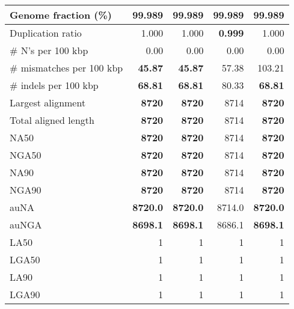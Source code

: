 \documentclass[12pt,a4paper]{article}
\begin{document}
\begin{table}[ht]
\begin{center}
\begin{tabular}{|l*{4}{|r}|}
Genome fraction (\%) & 99.989 & 99.989 & 99.989 & 99.989 \\ \hline
Duplication ratio & 1.000 & 1.000 & {\bf 0.999} & 1.000 \\ \hline
\# N's per 100 kbp & 0.00 & 0.00 & 0.00 & 0.00 \\ \hline
\# mismatches per 100 kbp & {\bf 45.87} & {\bf 45.87} & 57.38 & 103.21 \\ \hline
\# indels per 100 kbp & {\bf 68.81} & {\bf 68.81} & 80.33 & {\bf 68.81} \\ \hline
Largest alignment & {\bf 8720} & {\bf 8720} & 8714 & {\bf 8720} \\ \hline
Total aligned length & {\bf 8720} & {\bf 8720} & 8714 & {\bf 8720} \\ \hline
NA50 & {\bf 8720} & {\bf 8720} & 8714 & {\bf 8720} \\ \hline
NGA50 & {\bf 8720} & {\bf 8720} & 8714 & {\bf 8720} \\ \hline
NA90 & {\bf 8720} & {\bf 8720} & 8714 & {\bf 8720} \\ \hline
NGA90 & {\bf 8720} & {\bf 8720} & 8714 & {\bf 8720} \\ \hline
auNA & {\bf 8720.0} & {\bf 8720.0} & 8714.0 & {\bf 8720.0} \\ \hline
auNGA & {\bf 8698.1} & {\bf 8698.1} & 8686.1 & {\bf 8698.1} \\ \hline
LA50 & 1 & 1 & 1 & 1 \\ \hline
LGA50 & 1 & 1 & 1 & 1 \\ \hline
LA90 & 1 & 1 & 1 & 1 \\ \hline
LGA90 & 1 & 1 & 1 & 1 \\ \hline
\end{tabular}
\end{center}
\end{table}
\end{document}
